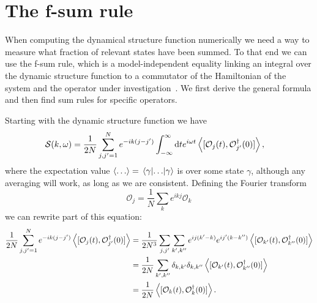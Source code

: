 \documentclass[11pt, a4paper]{report} %
\newcommand{\operator}{\mathcal{O}}
\begin{document}
\chapter{The f-sum rule}
\label{cha:f-sum-rule}

When computing the dynamical structure function numerically we need a way to measure what fraction of relevant states have been summed.
To that end we can use the f-sum rule, which is a model-independent equality linking an integral over the dynamic structure function to a commutator of the Hamiltonian of the system and the operator under investigation~\cite{pitaevskii}.
We first derive the general formula and then find sum rules for specific operators.

Starting with the dynamic structure function we have
\begin{align}
  	\mathcal{S}(k,\omega) &= \frac{1}{2N} \sum_{j,j'=1}^{N} e^{-ik(j-j')} \int_{-\infty}^{\infty}\dd t e^{i\omega t}\expval{[\operator_j(t),\operator_{j'}^{\dagger}(0)]},
\end{align}
where the expectation value \(\expval{\ldots} = \matrixel{\gamma}{\ldots}{\gamma}\) is over some state \(\gamma\), although any averaging will work, as long as we are consistent.
Defining the Fourier transform
\begin{equation}
  \mathcal{O}_j = \frac{1}{N} \sum_k e^{ikj} \mathcal{O}_k
\end{equation}
we can rewrite part of this equation:
\begin{align}
  \frac{1}{2N} \sum_{j,j'=1}^{N} e^{-ik(j-j')} \expval{[\operator_j(t),\operator_{j'}^{\dagger}(0)]} &= \frac{1}{2N^3} \sum_{j, j'}\sum_{k',k''} e^{ij(k'-k)}e^{ij'(k-k'')}  \expval{[\operator_{k'}(t),\operator_{k''}^{\dagger}(0)]}\\
&= \frac{1}{2N} \sum_{k',k''} \delta_{k,k'}\delta_{k,k''}  \expval{[\operator_{k'}(t),\operator_{k''}^{\dagger}(0)]} \\
&= \frac{1}{2N}  \expval{[\operator_{k}(t),\operator_{k}^{\dagger}(0)]}.
\end{align}
\end{document}
